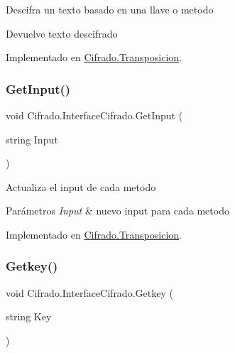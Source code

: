 Descifra un texto basado en una llave o metodo 

\begin{DoxyReturn}{Devuelve}
texto descifrado
\end{DoxyReturn}


Implementado en \hyperlink{class_cifrado_1_1_transposicion_ac2934aaba73bbaca8e5da6b788cf10b2}{Cifrado.\+Transposicion}.

\mbox{\label{interface_cifrado_1_1_interface_cifrado_ab573118c8f88269038b21e452a9fa8d3}} 
\subsubsection{\texorpdfstring{Get\+Input()}{GetInput()}}
{\footnotesize\ttfamily void Cifrado.\+Interface\+Cifrado.\+Get\+Input (\begin{DoxyParamCaption}\item[{string}]{Input }\end{DoxyParamCaption})}



Actualiza el input de cada metodo 


\begin{DoxyParams}{Parámetros}
{\em Input} & nuevo input para cada metodo\\
\hline
\end{DoxyParams}


Implementado en \hyperlink{class_cifrado_1_1_transposicion_a41f7391ffcd850e2aebf9852248d6d8d}{Cifrado.\+Transposicion}.

\mbox{\label{interface_cifrado_1_1_interface_cifrado_a0eee6d795ffd5d8f9971e1d8fb6f4b8d}} 
\subsubsection{\texorpdfstring{Getkey()}{Getkey()}}
{\footnotesize\ttfamily void Cifrado.\+Interface\+Cifrado.\+Getkey (\begin{DoxyParamCaption}\item[{string}]{Key }\end{DoxyParamCaption})}



